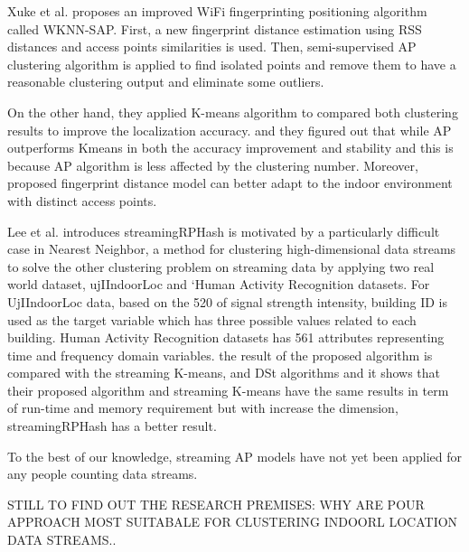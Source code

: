 \documentclass[../UNBThesis2.tex]{subfiles}
\begin{document}
Xuke et al. \cite{hu2015improving} proposes an improved WiFi fingerprinting positioning algorithm called WKNN-SAP. First, a new fingerprint distance estimation using RSS distances and access points similarities is used. Then, semi-supervised AP clustering algorithm is applied to find isolated points and remove them to have a reasonable clustering output and eliminate some outliers.

On the other hand, they applied K-means algorithm to compared both clustering results to improve the localization accuracy. and they figured out that while AP outperforms Kmeans in both the accuracy improvement and stability and this is because AP algorithm is less affected by the clustering number. Moreover, proposed fingerprint distance model can better adapt to the indoor environment with distinct access points.






Lee et al. \cite{carraher2016random} introduces streamingRPHash is motivated by
a particularly difficult case in Nearest Neighbor, a method for clustering high-dimensional data streams to solve the other clustering problem on streaming data by applying two real world dataset, ujIIndoorLoc and ‘Human Activity Recognition datasets.
For UjIIndoorLoc data, based on the 520 of signal strength intensity, building ID is used as the target variable which has three possible values related to each building.
Human Activity Recognition datasets has 561 attributes representing time and frequency domain variables.
the result of the proposed algorithm is compared with the streaming K-means, and DSt algorithms and it shows that their proposed algorithm and streaming K-means have the same results in term of run-time and memory requirement but with increase the dimension, streamingRPHash has a better result.



To the best of our knowledge, streaming AP models have not yet been applied for any people counting data streams.  

 STILL TO FIND OUT THE RESEARCH PREMISES: WHY ARE POUR APPROACH MOST SUITABALE FOR CLUSTERING INDOORL LOCATION DATA STREAMS..
\end{document}
